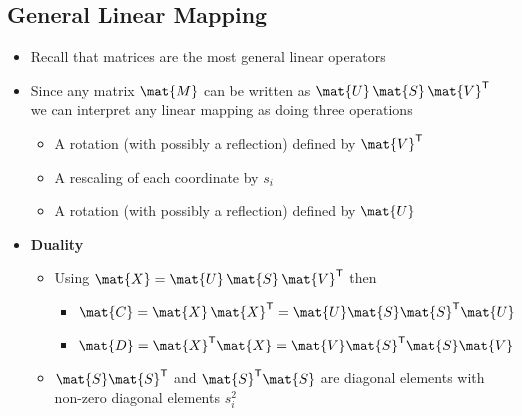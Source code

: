 \documentclass[11pt]{article}
\newcommand{\tr}{\textsf{T}}
\begin{document}
\subsection{General Linear Mapping}
\label{sec:org50315e1}
\begin{itemize}
\item Recall that matrices are the most general linear operators
\item Since any matrix \(\mat{M}\) can be written as
\(\mat{U}\,\mat{S}\,\mat{V}^\tr\) we can interpret any linear
mapping as doing three operations
\begin{itemize}
\item A rotation (with possibly a reflection) defined by \(\mat{V}^\tr\)
\item A rescaling of each coordinate by \(s_i\)
\item A rotation (with possibly a reflection) defined by \(\mat{U}\)
\end{itemize}
\item \textbf{Duality}
\begin{itemize}
\item Using \(\mat{X} = \mat{U}\,\mat{S}\,\mat{V}^\tr\) then
\begin{itemize}
\item \(\mat{C} = \mat{X}\,\mat{X}^\tr = \mat{U}\mat{S}\mat{S}^\tr\mat{U}\)
\item \(\mat{D} = \mat{X}^\tr\mat{X} = \mat{V}\mat{S}^\tr\mat{S}\mat{V}\)
\end{itemize}
\item \(\mat{S}\mat{S}^\tr\) and \(\mat{S}^\tr\mat{S}\) are diagonal
elements with non-zero diagonal elements \(s_i^2\)
\end{itemize}
\end{itemize}
\end{document}
